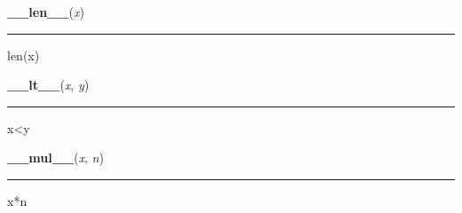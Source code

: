     \vspace{0.5ex}

\hspace{.8\funcindent}\begin{boxedminipage}{\funcwidth}

    \raggedright \textbf{\_\_len\_\_}(\textit{x})

    \vspace{-1.5ex}

    \rule{\textwidth}{0.5\fboxrule}
\setlength{\parskip}{2ex}
    len(x)

\setlength{\parskip}{1ex}
    \end{boxedminipage}

    \label{posix:stat_result:__lt__}

    \vspace{0.5ex}

\hspace{.8\funcindent}\begin{boxedminipage}{\funcwidth}

    \raggedright \textbf{\_\_lt\_\_}(\textit{x}, \textit{y})

    \vspace{-1.5ex}

    \rule{\textwidth}{0.5\fboxrule}
\setlength{\parskip}{2ex}
    x{\textless}y

\setlength{\parskip}{1ex}
    \end{boxedminipage}

    \label{posix:stat_result:__mul__}

    \vspace{0.5ex}

\hspace{.8\funcindent}\begin{boxedminipage}{\funcwidth}

    \raggedright \textbf{\_\_mul\_\_}(\textit{x}, \textit{n})

    \vspace{-1.5ex}

    \rule{\textwidth}{0.5\fboxrule}
\setlength{\parskip}{2ex}
    x*n

\setlength{\parskip}{1ex}
    \end{boxedminipage}

    \label{posix:stat_result:__ne__}

    \vspace{0.5ex}


